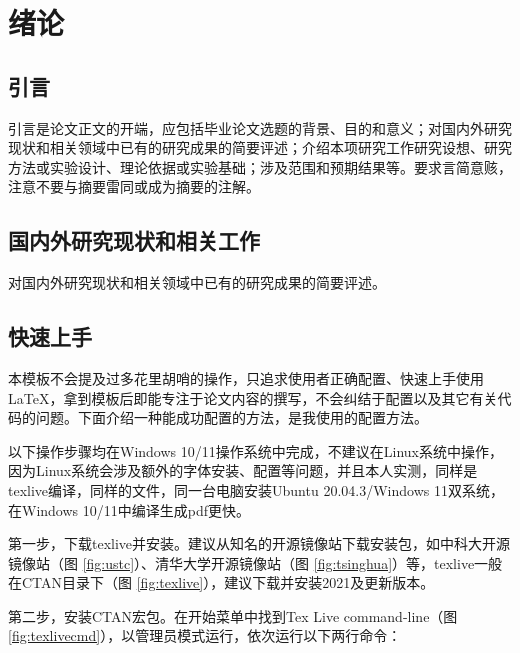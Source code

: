 
\chapter{绪论}
\label{cha:introduction}
\section{引言}
\label{sec:prologue}
引言是论文正文的开端，应包括毕业论文选题的背景、目的和意义；对国内外研究现状和相关领域中已有的研究成果的简要评述；介绍本项研究工作研究设想、研究方法或实验设计、理论依据或实验基础；涉及范围和预期结果等。要求言简意赅，注意不要与摘要雷同或成为摘要的注解。

\section{国内外研究现状和相关工作}
\label{sec:related_work}
对国内外研究现状和相关领域中已有的研究成果的简要评述。

\section{快速上手}
\label{sec:latex_basic}
本模板不会提及过多花里胡哨的操作，只追求使用者正确配置、快速上手使用LaTeX，拿到模板后即能专注于论文内容的撰写，不会纠结于配置以及其它有关代码的问题。下面介绍一种能成功配置的方法，是我使用的配置方法。

以下操作步骤均在Windows 10/11操作系统中完成，不建议在Linux系统中操作，因为Linux系统会涉及额外的字体安装、配置等问题，并且本人实测，同样是texlive编译，同样的文件，同一台电脑安装Ubuntu 20.04.3/Windows 11双系统，在Windows 10/11中编译生成pdf更快。

第一步，下载texlive并安装。建议从知名的开源镜像站下载安装包，如中科大开源镜像站（图 \ref{fig:ustc}）、清华大学开源镜像站（图 \ref{fig:tsinghua}）等，texlive一般在CTAN目录下（图 \ref{fig:texlive}），建议下载并安装2021及更新版本。




第二步，安装CTAN宏包。在开始菜单中找到Tex Live command-line（图 \ref{fig:texlivecmd}），以管理员模式运行，依次运行以下两行命令：

